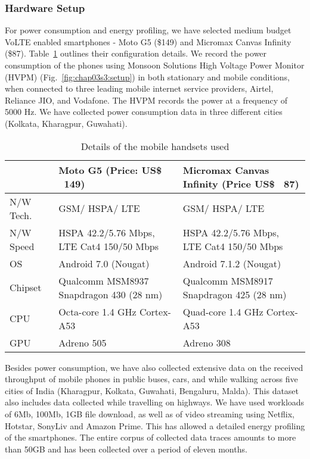 \subsubsection{Hardware Setup}
For power consumption and energy profiling, we have selected medium budget VoLTE enabled smartphones -  Moto G5  (\$149) and Micromax Canvas Infinity (\$87). Table~\ref{tab:chap03s3:handset_details} outlines their configuration details. We record the power consumption of the phones using Monsoon Solutions High Voltage Power Monitor (HVPM) \cite{HVPM, Yang2018,Geng2015} (Fig.~\ref{fig:chap03s3:setup}) in both stationary and mobile conditions, when connected to three leading mobile internet service providers, Airtel, Reliance JIO, and Vodafone. The \ac{HVPM} records the power at a frequency of 5000 Hz. We have collected power consumption data in three different cities (Kolkata, Kharagpur, Guwahati).
\begin{table}[!h]
    \scriptsize
    \centering
      \caption{Details of the mobile handsets used}
    \begin{tabular}{|p{0.6cm}||p{3.4cm}|p{3.4cm}|}
    \hline
         \textbf{}  & \textbf{Moto G5 (Price: US\$ ~149)} & \textbf{Micromax Canvas Infinity (Price US\$ ~87)}\\
          \hline \hline 
         N/W Tech. & GSM/ HSPA/ LTE &  GSM/ HSPA/ LTE\\ \hline
         N/W Speed & HSPA 42.2/5.76 Mbps, LTE Cat4 150/50 Mbps & HSPA 42.2/5.76 Mbps, LTE Cat4 150/50 Mbps\\ \hline
         OS & Android 7.0 (Nougat) & Android 7.1.2 (Nougat) \\ \hline
         Chipset & Qualcomm MSM8937 Snapdragon 430 (28 nm) & Qualcomm MSM8917 Snapdragon 425 (28 nm)\\ \hline
         CPU & Octa-core 1.4 GHz Cortex-A53 & Quad-core 1.4 GHz Cortex-A53\\ \hline
         GPU & Adreno 505 & Adreno 308\\ \hline
    \end{tabular}
    \label{tab:chap03s3:handset_details}
\end{table}
\indent Besides power consumption, we have also collected extensive data on the received throughput of mobile phones in public buses, cars, and while walking across five cities of India (Kharagpur, Kolkata, Guwahati, Bengaluru, Malda). This dataset also includes data collected while travelling on highways. We have used workloads of 6Mb, 100Mb, 1GB file download, as well as of video streaming using Netflix, Hotstar, SonyLiv and Amazon Prime. This has allowed a detailed energy profiling of the smartphones. The entire corpus of collected data traces amounts to more than 50GB and has been collected over a period of eleven months. 
